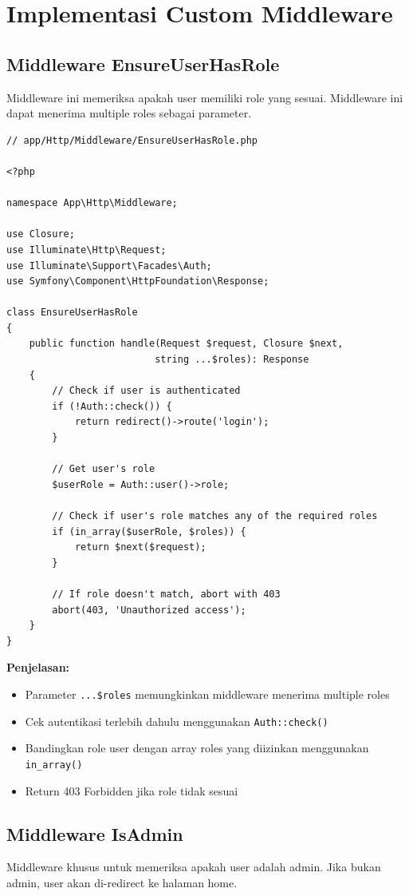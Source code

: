 \documentclass[a4paper,oneside,11pt]{book}
\begin{document}
\section{Implementasi Custom Middleware}

\subsection{Middleware EnsureUserHasRole}
Middleware ini memeriksa apakah user memiliki role yang sesuai. Middleware ini dapat menerima multiple roles sebagai parameter.

\begin{lstlisting}[style=phpstyle]
// app/Http/Middleware/EnsureUserHasRole.php

<?php

namespace App\Http\Middleware;

use Closure;
use Illuminate\Http\Request;
use Illuminate\Support\Facades\Auth;
use Symfony\Component\HttpFoundation\Response;

class EnsureUserHasRole
{
    public function handle(Request $request, Closure $next, 
                          string ...$roles): Response
    {
        // Check if user is authenticated
        if (!Auth::check()) {
            return redirect()->route('login');
        }

        // Get user's role
        $userRole = Auth::user()->role;

        // Check if user's role matches any of the required roles
        if (in_array($userRole, $roles)) {
            return $next($request);
        }

        // If role doesn't match, abort with 403
        abort(403, 'Unauthorized access');
    }
}
\end{lstlisting}

\textbf{Penjelasan:}
\begin{itemize}
    \item Parameter \texttt{...\$roles} memungkinkan middleware menerima multiple roles
    \item Cek autentikasi terlebih dahulu menggunakan \texttt{Auth::check()}
    \item Bandingkan role user dengan array roles yang diizinkan menggunakan \texttt{in\_array()}
    \item Return 403 Forbidden jika role tidak sesuai
\end{itemize}

\subsection{Middleware IsAdmin}
Middleware khusus untuk memeriksa apakah user adalah admin. Jika bukan admin, user akan di-redirect ke halaman home.
\end{document}
